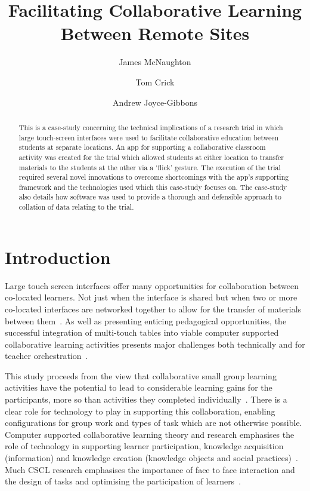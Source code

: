 \documentclass[a4paper,11pt]{article}
\title{Facilitating Collaborative Learning Between Remote Sites}
\author[1]{James McNaughton}
\author[2]{Tom Crick}
\author[3]{Andrew Joyce-Gibbons}
\affil[1 \& 3]{ School of Education, Durham University, UK}
\affil[2]{Department of Computing \& Information Systems, Cardiff
  Metropolitan University, UK}
\affil[1]{\protect\url{j.a.mcnaughton@durham.ac.uk}}
\affil[2]{\protect\url{tcrick@cardiffmet.ac.uk}}
\affil[3]{\protect\url{andrew.joyce-gibbons@durham.ac.uk}}
\date{ }
\begin{document}
\maketitle


\begin{abstract}
This is a case-study concerning the technical implications of a research trial in which large touch-screen interfaces were used to facilitate collaborative education between students at separate locations.
An app for supporting a collaborative classroom activity was created for the trial which allowed students at either location to transfer materials to the students at the other via a `flick' gesture.
The execution of the trial required several novel innovations to overcome shortcomings with the app's supporting framework and the technologies used which this case-study focuses on.
The case-study also details how software was used to provide a thorough and defensible approach to collation of data relating to the trial.
\end{abstract}

\section{Introduction}

Large touch screen interfaces offer many opportunities for collaboration between co-located learners.
Not just when the interface is shared but when two or more co-located interfaces are networked together to allow for the transfer of materials between them~\cite{kharrufa:2013,kreitmayer:2013}.
As well as presenting enticing pedagogical opportunities, the successful integration of multi-touch tables into viable computer supported collaborative learning activities presents major challenges both technically and for teacher orchestration~\cite{dillenbourg:2011}. 

This study proceeds from the view that collaborative small group learning activities have the potential to lead to considerable learning gains for the participants, more so than activities they completed individually~\cite{odonnell:2013,barron:2008}.
There is a clear role for technology to play in supporting this collaboration, enabling configurations for group work and types of task which are not otherwise possible.
Computer supported collaborative learning theory and research emphasises the role of technology in supporting learner participation, knowledge acquisition (information) and knowledge creation (knowledge objects and social practices)~\cite{lipponen:2004}.
Much CSCL research emphasises the importance of face to face interaction and the design of tasks and optimising the participation of learners~\cite{stahl:2014}.
\end{document}

